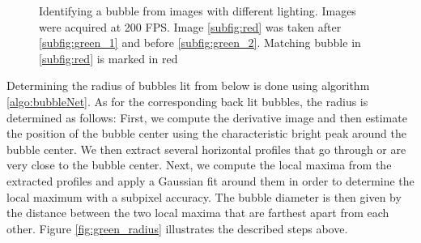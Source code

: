 \begin{figure}
					\caption{Identifying a bubble from images with different lighting. Images were acquired at 200 FPS. Image \ref{subfig:red} was taken after \ref{subfig:green_1} and before \ref{subfig:green_2}. Matching bubble in \ref{subfig:red} is marked in red }
					\label{fig:radius_calib_demo}
			\end{figure}
			
			
			Determining the radius of bubbles lit from below is done using algorithm \ref{algo:bubbleNet}. As for the corresponding back lit bubbles, the radius is determined as follows:
			First, we compute the derivative image and then estimate the position of the bubble center using the characteristic bright peak around the bubble center. We then extract several horizontal profiles that go through or are very close to the bubble center. Next, we compute the local maxima from the extracted profiles and apply a Gaussian fit around them in order to determine the local maximum with a subpixel accuracy. The bubble diameter is then given by the distance between the two local maxima that are farthest apart from each other. Figure \ref{fig:green_radius} illustrates the described steps above. 
			
